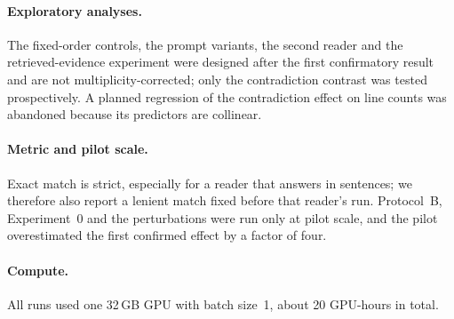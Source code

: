\paragraph{Exploratory analyses.} The fixed-order controls, the prompt variants, the second reader and the retrieved-evidence experiment were designed after the first confirmatory result and are not multiplicity-corrected; only the contradiction contrast was tested prospectively. A planned regression of the contradiction effect on line counts was abandoned because its predictors are collinear.

\paragraph{Metric and pilot scale.} Exact match is strict, especially for a reader that answers in sentences; we therefore also report a lenient match fixed before that reader's run. Protocol~B, Experiment~0 and the perturbations were run only at pilot scale, and the pilot overestimated the first confirmed effect by a factor of four.

\paragraph{Compute.} All runs used one 32\,GB GPU with batch size~1, about 20 GPU-hours in total.
